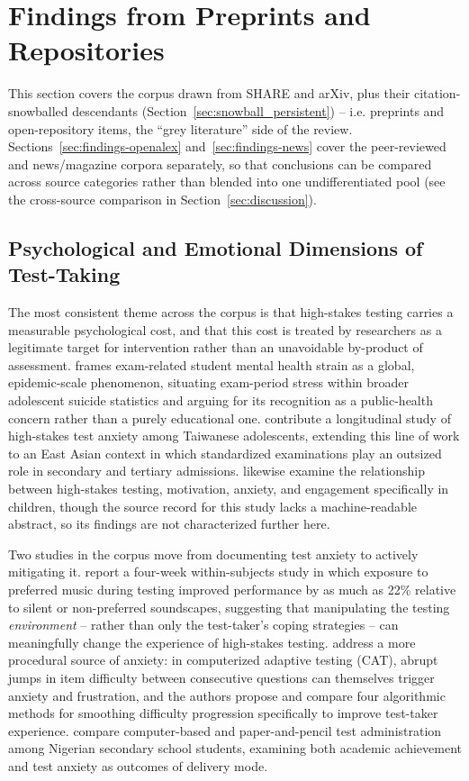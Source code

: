 \documentclass[11pt]{article}
\begin{document}
\section{Findings from Preprints and Repositories}
\label{sec:findings-preprints}

This section covers the corpus drawn from SHARE and arXiv, plus their citation-snowballed descendants (Section~\ref{sec:snowball_persistent}) -- i.e. preprints and open-repository items, the ``grey literature'' side of the review. Sections~\ref{sec:findings-openalex} and~\ref{sec:findings-news} cover the peer-reviewed and news/magazine corpora separately, so that conclusions can be compared across source categories rather than blended into one undifferentiated pool (see the cross-source comparison in Section~\ref{sec:discussion}).

\subsection{Psychological and Emotional Dimensions of Test-Taking}

The most consistent theme across the corpus is that high-stakes testing carries a measurable psychological cost, and that this cost is treated by researchers as a legitimate target for intervention rather than an unavoidable by-product of assessment. \citet{george2024examstress} frames exam-related student mental health strain as a global, epidemic-scale phenomenon, situating exam-period stress within broader adolescent suicide statistics and arguing for its recognition as a public-health concern rather than a purely educational one. \citet{tseng2024taiwanese} contribute a longitudinal study of high-stakes test anxiety among Taiwanese adolescents, extending this line of work to an East Asian context in which standardized examinations play an outsized role in secondary and tertiary admissions. \citet{wallace2010motivation} likewise examine the relationship between high-stakes testing, motivation, anxiety, and engagement specifically in children, though the source record for this study lacks a machine-readable abstract, so its findings are not characterized further here.

Two studies in the corpus move from documenting test anxiety to actively mitigating it. \citet{amsberry2018sound} report a four-week within-subjects study in which exposure to preferred music during testing improved performance by as much as 22\% relative to silent or non-preferred soundscapes, suggesting that manipulating the testing \emph{environment} -- rather than only the test-taker's coping strategies -- can meaningfully change the experience of high-stakes testing. \citet{watson2026cat} address a more procedural source of anxiety: in computerized adaptive testing (CAT), abrupt jumps in item difficulty between consecutive questions can themselves trigger anxiety and frustration, and the authors propose and compare four algorithmic methods for smoothing difficulty progression specifically to improve test-taker experience. \citet{eleje2023cbtppt} compare computer-based and paper-and-pencil test administration among Nigerian secondary school students, examining both academic achievement and test anxiety as outcomes of delivery mode.
\end{document}
